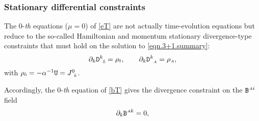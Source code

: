\documentclass[
10pt, %
a4paper, %
oneside, %
headinclude,footinclude, %
BCOR5mm, %
]{scrartcl}
\newcommand{\sA}{\mathsmaller A}
\newcommand{\sB}{\mathsmaller B}
\newcommand{\sC}{\mathsmaller C}
\newcommand{\sD}{\mathsmaller D}
\newcommand{\sE}{\mathsmaller E}
\newcommand{\pd}[1]{\partial_{#1}}
\newcommand{\mg}[1]{\kappa_{#1}}			%
\newcommand{\tetrsymbol}{h}
\newcommand{\itetrsymbol}{\eta}
\newcommand{\itetr}[2]{\itetrsymbol^{#1}_{\phantom{#1}#2}}
\newcommand{\tetr}[2]{\tetrsymbol^{#1}_{\phantom{#1}#2}}
\newcommand{\detTetr}{\tetrsymbol}
\newcommand{\Dfin}[2]{\mathtt{D}_{\phantom{#2}#1}^{#2}}	%
\newcommand{\Efin}[2]{\mathtt{E}^{#1}_{\phantom{#1}#2}}	%
\newcommand{\Ufin}{\mathtt{U}}
\newcommand{\Bfin}[2]{\mathtt{B}^{#1#2}}	%
\newcommand{\LCsymb}{\bm{\in}}    %
\newcommand{\NC}[2]{J^{#2}_{\phantom{#2}#1}}
\newcommand{\indalg}[1]{\hat{\mathsmaller{#1}}}
\newcommand{\shift}[1]{\beta^{#1}}
\begin{document}



\subsubsection{Stationary differential constraints}

The $ 0 $-\textit{th} equations ($ \mu=0 $) of \eqref{eT} are not actually time-evolution equations 
but 
reduce to the so-called Hamiltonian and momentum stationary divergence-type constraints that must 
hold on the 
solution to \eqref{eqn.3+1.summary}:
\begin{equation}\label{eqn.div.constrD}
	\pd{k} \Dfin{\indalg{0}}{k} = \rho_{\indalg{0}},
	\qquad
	\pd{k} \Dfin{\sA}{k} = \rho_{\sA}, 
\end{equation}
with $ \rho_{\indalg{0}} = -\alpha^{-1} \Ufin = \NC{\indalg{0}}{0} $.

Accordingly, the $ 0 $-\textit{th} equation of \eqref{bT} gives the divergence constraint on the $ 
\Bfin{\sA}{i} $ field
\begin{equation}\label{eqn.div.constrB}
	\pd{k} \Bfin{\sA}{k} = 0,
\end{equation}
\end{document}
